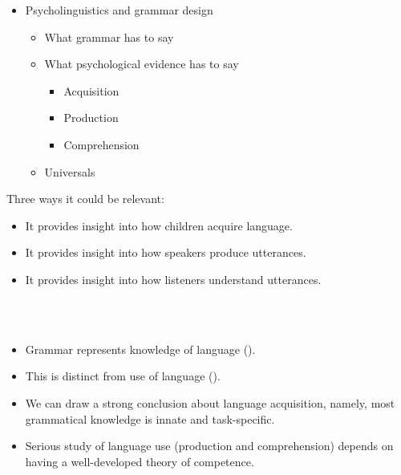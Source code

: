 \documentclass[a4paper,landscape,headrule,footrule]{foils}
\begin{document}
\avmfont{\it}
\maketitle



\begin{itemize}
\item Psycholinguistics and grammar design
  \begin{itemize}
  \item What grammar has to say
  \item What psychological evidence has to say
    \begin{itemize}
    \item Acquisition
    \item Production
    \item Comprehension
    \end{itemize}
  \item Universals
  \end{itemize}
\end{itemize}


Three ways it could be relevant:

\begin{itemize}
\item It provides insight into how children 
acquire language.
\item It provides insight into how speakers 
produce utterances. 
\item It provides insight into how listeners 
understand utterances. 
\end{itemize}


\vfill
\begin{center}\Large
  \\[3ex]
  \\[3ex]
\end{center}
\vfill
{}


\begin{itemize}
\item Grammar represents knowledge of language 
().
\item This is distinct from use of language ().
\item We can draw a strong conclusion about language 
acquisition, namely, most grammatical knowledge is 
innate and task-specific.
\item Serious study of language use (production and 
comprehension) depends on having a well-developed 
theory of competence.
\end{itemize}
\end{document}
